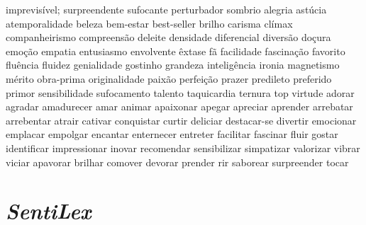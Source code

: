 \begin{appendices}
imprevis\'{i}vel; surpreendente sufocante perturbador sombrio alegria ast\'{u}cia atemporalidade beleza bem-estar best-seller brilho carisma cl\'{i}max companheirismo compreens\~ao deleite densidade diferencial divers\~ao do\c{c}ura emo\c{c}\~ao empatia entusiasmo envolvente \^{e}xtase f\~a facilidade fascina\c{c}\~ao favorito flu\^{e}ncia fluidez genialidade gostinho grandeza intelig\^{e}ncia ironia magnetismo m\'{e}rito obra-prima originalidade paix\~ao perfei\c{c}\~ao prazer predileto preferido primor sensibilidade sufocamento talento taquicardia ternura top virtude adorar agradar amadurecer amar animar apaixonar apegar apreciar aprender arrebatar arrebentar atrair cativar conquistar curtir deliciar destacar-se divertir emocionar emplacar empolgar encantar enternecer entreter facilitar fascinar fluir gostar identificar impressionar inovar recomendar sensibilizar simpatizar valorizar vibrar viciar apavorar brilhar comover devorar prender rir saborear surpreender tocar

\section{\textit{SentiLex}}

\end{appendices}
